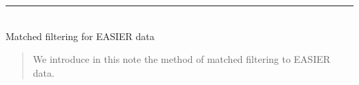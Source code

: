 \documentclass[twoside, final, 11pt]{articleMine}
\begin{document}
\modulolinenumbers[2]



\renewcommand\linenumberfont{\small\rmfamily}
\begin{center}
  \vspace*{-13ex}

  \rule{\linewidth}{0.1mm}  \\[17mm] {\huge  Matched filtering for EASIER data}
     \begin{flushright}
       \small 
     
     \end{flushright}

\end{center}
% 
\vspace*{2ex} 
%
\thispagestyle{empty}
\noindent
\begin{abstract}
  \noindent
We introduce in this note the method of matched filtering to EASIER data.
\end{abstract}

%
\thispagestyle{empty}
\noindent





\end{document}
